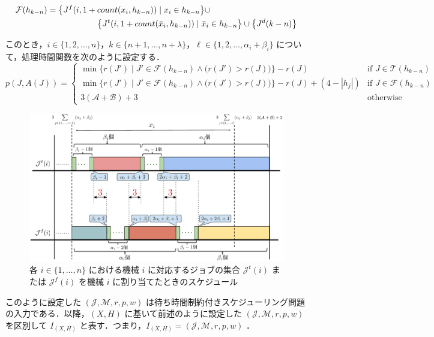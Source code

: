\documentclass[12pt]{optlab-bachelor}
\begin{document}
\begin{equation}
  \begin{split}
    \mathcal{F}(h_{k - n}) &= \big\{J^f(i,1 + count(
    x_i,h_{k - n})) \mid x_i \in h_{k - n} \big\} \cup \\ &\qquad\qquad\qquad \big\{J^t(i,1 + count(\bar x_i,h_{k - n})) \mid \bar x_i \in h_{k - n}\big\}  \cup \big\{J^d(k - n)\big\} \notag
  \end{split}
\end{equation}

このとき，$i \in \{1,2,\ldots,n\}$，$k \in \{n + 1, \ldots , n + \lambda\}$，$\ell \in \{1,2,\ldots, \alpha_i + \beta_i\}$ について，処理時間関数を次のように設定する．
{\small
\begin{equation}
  p(J,A(J)) = \left\{ \begin{array}{lll} \min \bigg\{r(J') \mid
  J' \in \mathcal{F}(h_{k - n}) \wedge \big(r(J') > r(J) \big) \bigg\} - r(J)
  & \text{if } J \in \mathcal{T}(h_{k - n}) \\ \min \bigg\{r(J') \mid
  J' \in \mathcal{F}(h_{k - n}) \wedge \big(r(J') > r(J) \big) \bigg\} - r(J)
  + (4 - |h_j|) & \text{if } J \in \mathcal{F}(h_{k - n}) \\ 3(\mathcal{A} + \mathcal{B}) + 3 & \text{otherwise}\end{array} \right. \tag{B.1}
\end{equation}
}

\begin{figure}[h]
  \centering
  \includegraphics[width = 16cm]{figure/3SAT1.pdf}
  \caption{各 $i \in \{1,\ldots,n\}$ における機械 $i$ に対応するジョブの集合 $\mathcal{J}^t(i)$ または $\mathcal{J}^f(i)$ を機械 $i$ に割り当てたときのスケジュール}
\end{figure}

このように設定した $(\mathcal{J}, \mathcal{M}, r, p, w)$ は待ち時間制約付きスケジューリング問題の入力である．以降，$(X,H)$ に基いて前述のように設定した $(\mathcal{J}, \mathcal{M}, r, p, w)$ を区別して $I_{(X,H)}$ と表す．つまり，$I_{(X,H)} = (\mathcal{J}, \mathcal{M}, r, p, w)$ ．
\end{document}
